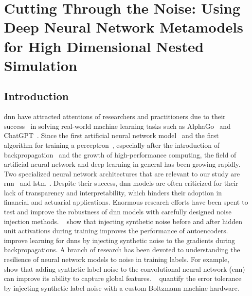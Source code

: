 \chapter{Cutting Through the Noise: Using Deep Neural Network Metamodels for High Dimensional Nested Simulation}
\label{chap:project2}


\section{Introduction}

\gls{dnn} have attracted attentions of researchers and practitioners due to their success~\citep{hastie2009elements,lecun2015deep} in solving real-world machine learning tasks such as AlphaGo~\citep{silver2016mastering} and ChatGPT~\citep{chatgpt}.
Since the first artificial neural network model~\citep{mcculloch1943logical} and the first algorithm for training a perceptron~\citep{rosenblatt1958perceptron}, especially after the introduction of backpropagation~\citep{rumelhart1985learning} and the growth of high-performance computing, the field of artificial neural network and deep learning in general has been growing rapidly.
Two specialized neural network architectures that are relevant to our study are \gls{rnn}~\citep{williams1989learning,sutskever2014sequence} and \gls{lstm}~\citep{hochreiter1997long,chung2014empirical}.
Despite their success, \gls{dnn} models are often criticized for their lack of transparency and interpretability, which hinders their adoption in financial and actuarial applications.
Enormous research efforts have been spent to test and improve the robustness of \gls{dnn} models with carefully designed noise injection methods.
~\cite{poole2014analyzing} show that injecting synthetic noise before and after hidden unit activations during training improves the performance of autoencoders.
~\cite{neelakantan2015adding} improve learning for \gls{dnn}s by injecting synthetic noise to the gradients during backpropagations.
A branch of research has been devoted to understanding the resilience of neural network models to noise in training labels.
For example,~\cite{luo2016understanding} show that adding synthetic label noise to the convolutional neural network (\gls{cnn}) can improve its ability to capture global features. 
~\cite{srivastava2014dropout} quantify the error tolerance by injecting synthetic label noise with a custom Boltzmann machine hardware.
